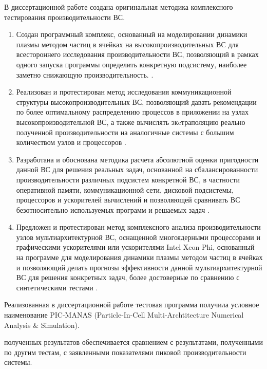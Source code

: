 В диссертационной работе создана оригинальная методика комплексного тестирования производительности ВС.

{}
\begin{enumerate}
	\item Создан программный комплекс, основанный на моделировании динамики плазмы методом частиц в ячейках на высокопроизводительных ВС для всестороннего исследования производительности ВС, позволяющий в рамках одного запуска программы определить конкретную подсистему, наиболее заметно снижающую производительность. \cite{LotovPoP,MatMod,VychMetPlasma,VestnikNNSU,adaptCPC}. 
	
	\item Реализован и протестирован метод исследования коммуникационной структуры высокопроизводительных ВС, позволяющий давать рекомендации по более оптимальному распределению процессов в приложении на узлах высокопроизводительной ВС, а также вычислять экcтраполяцию реально полученной производительности на аналогичные системы с большим количеством узлов и процессоров \cite{vakbib2,VestnikNNSU}.
	
	\item Разработана и обоснована методика расчета абсолютной оценки пригодности данной ВС для решения реальных задач, основанной на сбалансированности производительности различных подсистем конкретной ВС, в частности оперативной памяти, коммуникационной сети, дисковой подсистемы, процессоров и ускорителей вычислений и позволяющей сравнивать ВС безотносительно используемых программ и решаемых задач \cite{multigridAuto,VestnikNNSU,SuperFrI,astroCoDesign,integrApproach,vak3multi}. 
	
	\item Предложен и протестирован метод комплексного анализа производительности узлов мультиархитектурной ВС, оснащенной многоядерными процессорами и графическими ускорителями или ускорителями Intel Xeon Phi, основанный на программе для моделирования динамики плазмы методом частиц в ячейках и позволяющий делать прогнозы эффективности данной мультиархитектурной ВС для решения конкретных задач, более достоверные по сравнению с синтетическими тестами  \cite{MohographyTarkov,VestnikNSU3D,MatMod,VychMethProgExa}.
\end{enumerate}

Реализованная в диссертационной работе тестовая программа получила условное наименование 
PIC-MANAS (Particle-In-Cell Multi-Archtitecture Numerical Analysis \& Simulation).


{\reliability}  полученных результатов обеспечивается сравнением с результатами, полученными по другим тестам, с заявленными показателями пиковой производительности системы.


